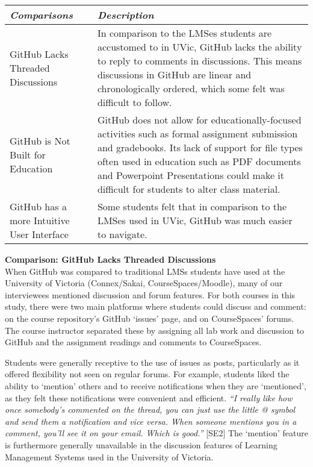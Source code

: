\begin{center}
\begin{tabular}{ | m{2em} | m{5cm} | }
\hline
\emph{Comparisons} & \emph{Description} \\
\hline
GitHub Lacks Threaded Discussions & In comparison to the LMSes students are accustomed to in UVic, GitHub lacks the ability to reply to comments in discussions. This means discussions in GitHub are linear and chronologically ordered, which some felt was difficult to follow. \\
\hline
GitHub is Not Built for Education & GitHub does not allow for educationally-focused activities such as formal assignment submission and gradebooks. Its lack of support for file types often used in education such as PDF documents and Powerpoint Presentations could make it difficult for students to alter class material. \\
\hline
GitHub has a more Intuitive User Interface & Some students felt that in comparison to the LMSes used in UVic, GitHub was much easier to navigate. \\
\hline
\end{tabular}
\end{center}

\textbf{Comparison: GitHub Lacks Threaded Discussions} \\
When GitHub was compared to traditional LMSs students have used at the University of Victoria (Connex/Sakai, CourseSpaces/Moodle), many of our interviewees mentioned discussion and forum features. For both courses in this study, there were two main platforms where students could discuss and comment: on the course repository's GitHub `issues' page, and on CourseSpaces' forums. The course instructor separated these by assigning all lab work and discussion to GitHub and the assignment readings and comments to CourseSpaces.

Students were generally receptive to the use of issues as posts, particularly as it offered flexibility not seen on regular forums. For example, students liked the ability to `mention' others and to receive notifications when they are `mentioned', as they felt these notifications were convenient and efficient. \textit{``I really like how once somebody's commented on the thread, you can just use the little @ symbol and send them a notification and vice versa. When someone mentions you in a comment, you'll see it on your email. Which is good.''} [SE2] The `mention' feature is furthermore generally unavailable in the discussion features of Learning Management Systems used in the University of Victoria.

